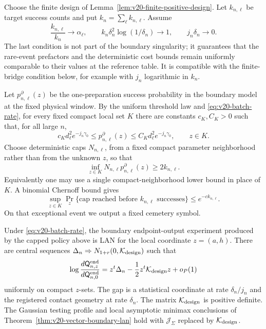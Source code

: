 Choose the finite design of Lemma~\ref{lem:v20-finite-positive-design}.  Let
$k_{n,\ell}$ be target success counts and put $k_n=\sum_\ell k_{n,\ell}$.
Assume
\begin{equation}\label{eq:v20-batch-rate}
 \frac{k_{n,\ell}}{k_n}\to\alpha_\ell,
 \qquad
 k_n\delta_n^2\log(1/\delta_n)\to1,
 \qquad
 j_n\delta_n\to0.
\end{equation}
The last condition is not part of the boundary singularity; it guarantees
that the rare-event prefactors and the deterministic cost bounds remain
uniformly comparable to their values at the reference table.  It is
compatible with the finite-bridge condition below, for example with
$j_n$ logarithmic in $k_n$.

Let $p^\partial_{n,\ell}(z)$ be the one-preparation success probability in the
boundary model at the fixed physical window.  By the uniform threshold law and
\eqref{eq:v20-batch-rate}, for every fixed compact local set $K$ there are
constants $c_K,C_K>0$ such that, for all large $n$,
\begin{equation}\label{eq:v20-uniform-success}
 c_Kd_\ell^2e^{-j_n\gamma_0}
 \le p^\partial_{n,\ell}(z)
 \le C_Kd_\ell^2e^{-j_n\gamma_0},
 \qquad z\in K.
\end{equation}
Choose deterministic caps $N_{n,\ell}$, from a fixed compact parameter
neighborhood rather than from the unknown $z$, so that
\begin{equation}\label{eq:v20-cap-choice}
 \inf_{z\in K}N_{n,\ell}p^\partial_{n,\ell}(z)
 \ge 2k_{n,\ell}.
\end{equation}
Equivalently one may use a single compact-neighborhood lower bound in place of
$K$.  A binomial Chernoff bound gives
\begin{equation}\label{eq:v20-cap-tail}
 \sup_{z\in K}\Pr_z\{\text{cap reached before }k_{n,\ell}
 \text{ successes}\}\le e^{-c k_{n,\ell}}.
\end{equation}
On that exceptional event we output a fixed cemetery symbol.

\begin{theorem}
\label{thm:v20-fixed-window-lan}
Under \eqref{eq:v20-batch-rate}, the boundary endpoint-output experiment
produced by the capped policy above is LAN for the local coordinate
$z=(a,h)$.  There are central sequences
$\Delta_n\Rightarrow N_{1+r}(0,\mathcal K_{\rm design})$ such that
\begin{equation}\label{eq:v20-physical-lan}
 \log\frac{d\mathsf Q_{n,z}^{\rm end}}{d\mathsf Q_{n,0}^{\rm end}}
 =z^t\Delta_n-\frac12z^t\mathcal K_{\rm design}z+o_P(1)
\end{equation}
uniformly on compact $z$-sets.  The gap is a statistical coordinate at rate
$\delta_n/j_n$ and the registered contact geometry at rate $\delta_n$.
The matrix $\mathcal K_{\rm design}$ is positive definite.  The Gaussian
testing profile and local asymptotic minimax conclusions of
Theorem~\ref{thm:v20-vector-boundary-lan} hold with
$\mathcal J_\Sigma$ replaced by $\mathcal K_{\rm design}$.
\end{theorem}

